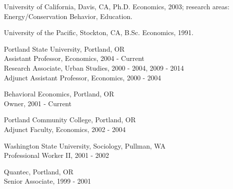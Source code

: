 \documentclass[Computer Science]{vita}
\begin{document}


  


\begin{vita}

  \begin{Degrees}
  \item University of California, Davis, CA, Ph.D. Economics, 2003;
    research areas: Energy/Conservation Behavior, Education.

  \item University of the Pacific, Stockton, CA, B.Sc. Economics,
    1991.
  \end{Degrees}

  \begin{Experience}
	
  \item Portland State University,  Portland, OR\\
    Assistant Professor, Economics, 2004 - Current\\
    Research Associate, Urban Studies, 2000 - 2004, 2009 - 2014\\
    Adjunct Assistant Professor, Economics, 2000 - 2004
	
  \item Behavioral Economics, Portland, OR\\
    Owner, 2001 - Current
		
  \item Portland Community College, Portland, OR\\
    Adjunct Faculty, Economics, 2002 - 2004
	
  \item Washington State University, Sociology, Pullman, WA\\
    Professional Worker II, 2001 - 2002
	
  \item Quantec, Portland, OR\\
    Senior Associate, 1999 - 2001
	

\end{Experience}
\end{vita}
\end{document}
